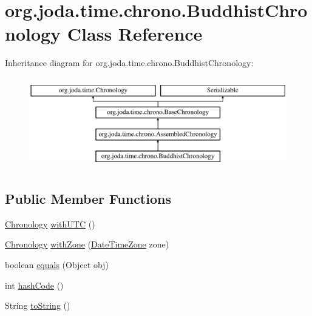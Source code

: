 \hypertarget{classorg_1_1joda_1_1time_1_1chrono_1_1_buddhist_chronology}{\section{org.\-joda.\-time.\-chrono.\-Buddhist\-Chronology Class Reference}
\label{classorg_1_1joda_1_1time_1_1chrono_1_1_buddhist_chronology}
}
Inheritance diagram for org.\-joda.\-time.\-chrono.\-Buddhist\-Chronology\-:\begin{figure}[H]
\begin{center}
\leavevmode
\includegraphics[height=4.000000cm]{classorg_1_1joda_1_1time_1_1chrono_1_1_buddhist_chronology}
\end{center}
\end{figure}
\subsection*{Public Member Functions}
\begin{DoxyCompactItemize}
\item 
\hyperlink{classorg_1_1joda_1_1time_1_1_chronology}{Chronology} \hyperlink{classorg_1_1joda_1_1time_1_1chrono_1_1_buddhist_chronology_a58019cde9420f095239425713f9497c4}{with\-U\-T\-C} ()
\item 
\hyperlink{classorg_1_1joda_1_1time_1_1_chronology}{Chronology} \hyperlink{classorg_1_1joda_1_1time_1_1chrono_1_1_buddhist_chronology_a0772537c3cf1053567e7f80a54a08e1d}{with\-Zone} (\hyperlink{classorg_1_1joda_1_1time_1_1_date_time_zone}{Date\-Time\-Zone} zone)
\item 
boolean \hyperlink{classorg_1_1joda_1_1time_1_1chrono_1_1_buddhist_chronology_aa774063a1513f69a5f291b1243bf6cbe}{equals} (Object obj)
\item 
int \hyperlink{classorg_1_1joda_1_1time_1_1chrono_1_1_buddhist_chronology_adc1baf06ec5864d6d827c052acd71974}{hash\-Code} ()
\item 
String \hyperlink{classorg_1_1joda_1_1time_1_1chrono_1_1_buddhist_chronology_aaa61ca340a92bb6d621986918369a2db}{to\-String} ()
\end{DoxyCompactItemize}
